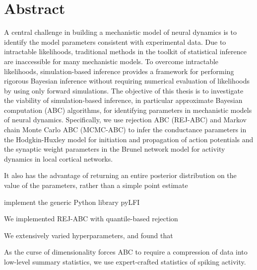 \chapter*{Abstract}
\thispagestyle{plain}



A central challenge in building a mechanistic model of neural dynamics is to identify the model parameters consistent with experimental data. Due to intractable likelihoods, traditional methods in the toolkit of statistical inference are inaccessible for many mechanistic models. To overcome intractable likelihoods, simulation-based inference provides a framework for performing rigorous Bayesian inference without requiring numerical evaluation of likelihoods by using only forward simulations. The objective of this thesis is to investigate the viability of simulation-based inference, in particular approximate Bayesian computation (ABC) algorithms, for identifying parameters in mechanistic models of neural dynamics. Specifically, we use rejection ABC (REJ-ABC) and Markov chain Monte Carlo ABC (MCMC-ABC) to infer the conductance parameters in the Hodgkin-Huxley model for initiation and propagation of action potentials and the synaptic weight parameters in the Brunel network model for activity dynamics in local cortical networks. 

It also has the
advantage of returning an entire posterior distribution on the
value of the parameters, rather than a simple point estimate

implement the generic Python library pyLFI 

We implemented REJ-ABC with quantile-based rejection

We extensively varied hyperparameters, and found that

As the curse of dimensionality forces ABC to require a compression of data into low-level summary statistics, we use expert-crafted statistics of spiking activity. 



